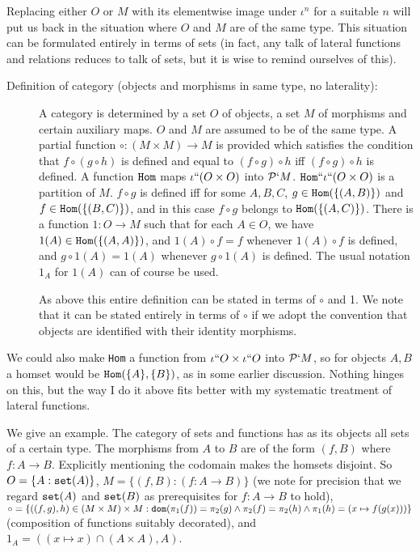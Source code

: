 \documentclass[12pt]{article}
\begin{document}
Replacing either $O$ or $M$ with its elementwise image under $\iota^n$ for a suitable $n$ will put us back in the situation where $O$ and $M$ are of the same type.
This situation can be formulated entirely in terms of sets (in fact, any talk of lateral functions and relations reduces to talk of sets, but it is wise to remind ourselves of this).  

\begin{description}

\item[Definition of category (objects and morphisms in same type, no laterality):]  A category is determined by a set $O$ of objects, a set $M$ of morphisms and certain auxiliary maps.  $O$ and $M$ are assumed to be of the same type.  A partial function $\circ:(M \times M) \rightarrow M$ is provided
which satisfies the condition that $f \circ (g \circ h)$ is defined and equal to $(f \circ g) \circ h$ iff $(f \circ g) \circ h$ is defined.
A function ${\tt Hom}$ maps $\iota``(O \times O)$ into ${\cal P}`M$.  ${\tt Hom}``\iota``(O\times O)$ is a partition of $M$.  $f \circ g$ is defined iff
for some $A,B,C$, $g \in {\tt Hom}(\{(A,B)\})$ and $f \in {\tt Hom}(\{(B,C)\})$, and in this case $f \circ g$ belongs to ${\tt Hom}(\{(A,C)\})$.  There is a function $1:O \rightarrow M$ such
that for each $A \in O$, we have $1(A) \in {\tt Hom}(\{(A,A)\})$, and $1(A) \circ f = f$ whenever $1(A) \circ f$ is defined, and $g \circ 1(A) = 1(A)$ whenever $g \circ 1(A)$ is defined.
The usual notation $1_A$ for $1(A)$ can of course be used.

As above this entire definition can be stated in terms of $\circ$ and 1.  We note that it can be stated entirely in terms of $\circ$ if we adopt the convention that objects
are identified with their identity morphisms.

\end{description}

We could also make {\tt Hom} a function from $\iota``O \times \iota``O$ into ${\cal P}`M$, so for objects $A,B$ a homset would be ${\tt Hom}(\{A\},\{B\})$, as in some earlier discussion.  Nothing hinges on this, but the way I do it above fits better with my systematic treatment of lateral functions.

We give an example.  The category of sets and functions has as its objects all sets of a certain type.  The morphisms from $A$ to $B$ are of the form $(f,B)$ where $f :A \rightarrow B$.  Explicitly mentioning the codomain makes the homsets disjoint.  So $O = \{A:{\tt set}(A)\}$, $M = \{(f,B):(f:A \rightarrow B)\}$ (we note for precision that we regard ${\tt set}(A)$ and
${\tt set}(B)$ as prerequisites for $f:A \rightarrow B$ to hold), $\circ = \{((f,g),h) \in (M \times M) \times M:{\tt dom}(\pi_1(f)) = \pi_2(g) \wedge \pi_2(f) = \pi_2(h) \wedge \pi_1(h) = (x \mapsto f(g(x)))\}$ (composition of functions suitably decorated), and $1_A = ((x \mapsto x)\cap (A \times A),A)$.
\end{document}
